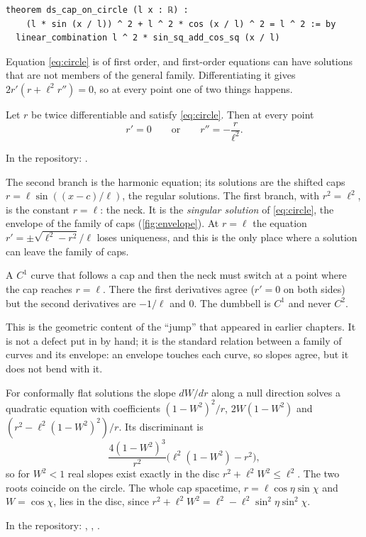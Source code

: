 \begin{leanbox}
\begin{Verbatim}[fontsize=\small]
theorem ds_cap_on_circle (l x : ℝ) :
    (l * sin (x / l)) ^ 2 + l ^ 2 * cos (x / l) ^ 2 = l ^ 2 := by
  linear_combination l ^ 2 * sin_sq_add_cos_sq (x / l)
\end{Verbatim}
\end{leanbox}

Equation \eqref{eq:circle} is of first order, and first-order equations can have solutions that are not members of the general family. Differentiating it gives $2r'(r+\ell^2r'')=0$, so at every point one of two things happens.

\begin{theorem}\proved\label{thm:branch}
Let $r$ be twice differentiable and satisfy \eqref{eq:circle}. Then at every point
\[
r'=0\qquad\text{or}\qquad r''=-\frac{r}{\ell^2}.
\]
\end{theorem}
\noindent In the repository: .

The second branch is the harmonic equation; its solutions are the shifted caps $r=\ell\sin((x-c)/\ell)$, the regular solutions. The first branch, with $r^2=\ell^2$, is the constant $r=\ell$: the neck. It is the \emph{singular solution} of \eqref{eq:circle}, the envelope of the family of caps (\cref{fig:envelope}). At $r=\ell$ the equation $r'=\pm\sqrt{\ell^2-r^2}/\ell$ loses uniqueness, and this is the only place where a solution can leave the family of caps.

\begin{corollary}
A $C^1$ curve that follows a cap and then the neck must switch at a point where the cap reaches $r=\ell$. There the first derivatives agree ($r'=0$ on both sides) but the second derivatives are $-1/\ell$ and $0$. The dumbbell is $C^1$ and never $C^2$.
\end{corollary}

This is the geometric content of the ``jump'' that appeared in earlier chapters. It is not a defect put in by hand; it is the standard relation between a family of curves and its envelope: an envelope touches each curve, so slopes agree, but it does not bend with it.

\begin{proposition}\proved\label{prop:disc}
For conformally flat solutions the slope $dW/dr$ along a null direction solves a quadratic equation with coefficients $(1-W^2)^2/r$, $2W(1-W^2)$ and $(r^2-\ell^2(1-W^2)^2)/r$. Its discriminant is
\[
\frac{4(1-W^2)^3}{r^2}\bigl(\ell^2(1-W^2)-r^2\bigr),
\]
so for $W^2<1$ real slopes exist exactly in the disc $r^2+\ell^2W^2\le\ell^2$. The two roots coincide on the circle. The whole cap spacetime, $r=\ell\cos\eta\sin\chi$ and $W=\cos\chi$, lies in the disc, since $r^2+\ell^2W^2=\ell^2-\ell^2\sin^2\eta\sin^2\chi$.
\end{proposition}
\noindent In the repository: , , .

